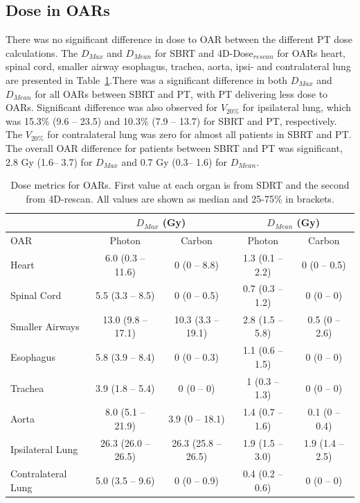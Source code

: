 \documentclass[type=dr, dr=rernat, acm$^3$entcolor=tud7b,colorbacktitle, bigchapter, openright, twoside, 12pt ]{tudthesis}
\begin{document}
\subsection{Dose in OARs}


There was no significant difference in dose to OAR between the different PT dose calculations. The $D_{Max}$ and $D_{Mean}$ for SBRT and 4D-Dose$_{rescan}$ for OARs heart, spinal cord, smaller airway esophagus, trachea, aorta, ipsi- and contralateral lung are presented in Table~\ref{tab:results}.There was a significant difference in both $D_{Max}$ and $D_{Mean}$ for all OARs between SBRT and PT, with PT delivering less dose to OARs. Significant difference was also observed for $V_{20\%}$ for ipsilateral lung, which was 15.3\% (9.6 – 23.5) and 10.3\% (7.9 – 13.7) for SBRT and PT, respectively. The $V_{20\%}$ for contralateral lung was zero for almost all patients in SBRT and PT. The overall OAR difference for patients between SBRT and PT was significant, 2.8 Gy (1.6– 3.7)  for $D_{Max}$ and 0.7 Gy (0.3– 1.6) for $D_{Mean}$. 



\begin{table}[H]
  \centering
  \caption{Dose metrics for OARs. First value at each organ is from SDRT and the second from 4D-rescan. All values are shown as median and 25-75\% in brackets.}
  \begin{tabular}{l|c|c|c|c|}
    \cline{2-5}
     & \multicolumn{2}{|c|}{$D_{Max}$ (Gy)} & \multicolumn{2}{|c|}{$D_{Mean}$ (Gy)} \\
     \hline
    \multicolumn{1}{|l|}{OAR} & Photon & Carbon & Photon & Carbon	\\
    \hline
\multicolumn{1}{|l|}{Heart} & 6.0 (0.3 – 11.6) & 0 (0 – 8.8)	& 1.3 (0.1 – 2.2) & 	0 (0 – 0.5) \\
\multicolumn{1}{|l|}{Spinal Cord} &	5.5 (3.3 – 8.5)	& 0 (0 – 0.5) &	0.7 (0.3 – 1.2) &	0 (0 – 0) \\
\multicolumn{1}{|l|}{Smaller Airways} & 13.0 (9.8 – 17.1) &	10.3 (3.3 – 19.1) &	2.8 (1.5 – 5.8) &	0.5 (0 – 2.6) \\
\multicolumn{1}{|l|}{Esophagus} & 5.8 (3.9 – 8.4) &	0 (0 – 0.3) &	1.1 (0.6 – 1.5) &	0 (0 – 0)\\
\multicolumn{1}{|l|}{Trachea} &3.9 (1.8 – 5.4) &	0 (0 – 0) &	1 (0.3 – 1.3) &	0 (0 – 0)\\
\multicolumn{1}{|l|}{Aorta} & 8.0 (5.1 – 21.9) &	3.9 (0 – 18.1) &	1.4 (0.7 – 1.6) &	0.1 (0 – 0.4)\\
\multicolumn{1}{|l|}{Ipsilateral Lung} & 26.3 (26.0 – 26.5) &	26.3 (25.8 – 26.5) &	1.9 (1.5 – 3.0) &	1.9 (1.4 – 2.5)\\
\multicolumn{1}{|l|}{Contralateral Lung} & 5.0 (3.5 – 9.6) &	0 (0 – 0.9) &	0.4 (0.2 – 0.6) &	0 (0 – 0) \\
    \hline\hline
  \end{tabular}
  \label{tab:results}
\end{table}
\end{document}
